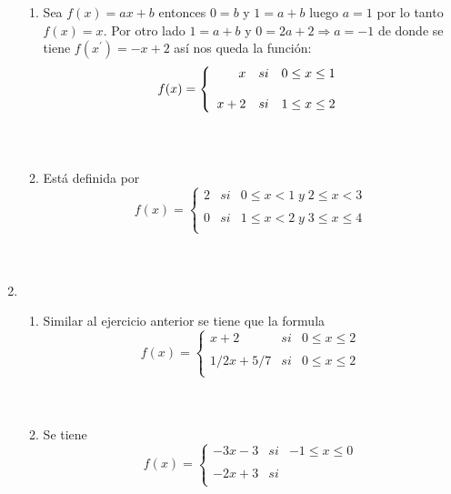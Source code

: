 \begin{enumerate}
\begin{enumerate}[\bfseries a.]
	\item  Sea $f(x)=ax+b$ entonces $0=b$ y $1=a+b$ luego $a=1$ por lo tanto $f(x)=x$. Por otro lado $1=a+b$ y $0=2a+2 \Longrightarrow a=-1$ de donde se tiene $f(x^{'})=-x+2$ así nos queda la función:
	$$f(x) = \left\{\begin{array}{r c l}
		x&si&0\leq x \leq 1\\
		\\ x+2&si&1\leq x \leq 2 \\
	    \end{array}\right.$$\\\\

	\item Está definida por $$f(x)=\left\{\begin{array}{rcl} 
				    2&si&0\leq x < 1 \; y \; 2 \leq x < 3\\
				    \\  0&si& 1\leq x < 2 \; y \; 3\leq x \leq 4\\
				    \end{array}\right.$$\\\\

    \end{enumerate}

    \item 
    \begin{enumerate}[\bfseries a.]

	\item Similar al ejercicio anterior se tiene que la formula 
	$$f(x)= \left\{ \begin{array}{rcl}
		x+2&si& 0 \leq x \leq 2 \\
		\\ 1/2x+5/7&si& 0\leq x \leq 2 \\ \end{array}\right.$$\\\\

	\item Se tiene 
	$$f(x)=\left\{\begin{array}{rcl} 
		-3x - 3&si&-1\leq x \leq 0\\
		\\-2x + 3&si&\\ \end{array} \right.$$\\\\


\end{enumerate}
\end{enumerate}
